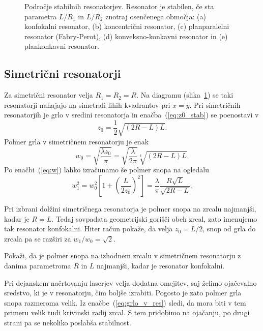 \begin{figure}[h]
\centering
\def\svgwidth{100truemm} 

\caption{Področje stabilnih resonatorjev. Resonator je stabilen, 
če sta parametra $L/R_{1}$ in $L/R_{2}$ znotraj osenčenega območja: (a) konfokalni resonator,
(b) koncentrični resonator, (c) planparalelni resonator (Fabry-Perot), 
(d) konveksno-konkavni resonator in (e) plankonkavni resonator.}
\label{fig:Podrocje-stabilnih-resonatorjev}
\end{figure}

\subsection*{Simetrični resonatorji}
Za simetrični resonator velja $R_{1}=R_{2}=R$. Na diagramu 
(slika~\ref{fig:Podrocje-stabilnih-resonatorjev}) 
se taki resonatorji nahajajo na simetrali lihih kvadrantov pri $x=y$. Pri simetričnih resonatorjih 
je grlo v sredini resonatorja in enačba~(\ref{eq:z0_stab}) se poenostavi v 
\begin{equation}
z_{0}=\frac{1}{2}\sqrt{(2R-L)L}.
\label{eq:zosim}
\end{equation}
Polmer grla v simetričnem resonatorju je enak
\begin{equation}
w_{0}=\sqrt{\frac{\lambda z_{0}}{\pi}}=\sqrt{\frac{\lambda}{2\pi}}\sqrt[4]{(2R-L)L}.
\label{eq:grlo_v_res}
\end{equation}
Po enačbi~(\ref{eq:w}) lahko izračunamo še polmer snopa na ogledalu
\begin{equation}
w_{1}^{2}=w_{0}^{2}\left[1+\left(\frac{L}{2z_{0}}\right)^{2}\right]=
\frac{\lambda}{\pi}\frac{R\sqrt{L}}{\sqrt{2R-L}}.
\end{equation}

Pri izbrani dolžini simetričnega resonatorja je polmer snopa na zrcalu najmanjši,
kadar je $R=L$. Tedaj sovpadata geometrijski gorišči obeh zrcal,
zato imenujemo tak resonator konfokalni. 
Hiter račun pokaže, da velja $z_{0}=L/2$, snop od grla do zrcala pa se razširi
za $w_1/w_0=\sqrt{2}$. 
\begin{definition}
\label{naloga:uklon_konf}
 Pokaži, da je polmer snopa na izhodnem zrcalu v simetričnem resonatorju z
 danima parametroma $R$ in $L$ najmanjši, kadar je resonator konfokalni.
\end{definition}

Pri dejanskem načrtovanju laserjev velja dodatna omejitev, saj želimo 
ojačevalno sredstvo, ki je v resonatorju, čim boljše izrabiti. Pogosto je zato 
polmer grla snopa razmeroma velik. Iz enačbe~(\ref{eq:grlo_v_res})
sledi, da mora biti v tem primeru velik tudi krivinski radij zrcal. S tem
pridobimo na ojačanju, po drugi strani pa se nekoliko poslabša stabilnost.

